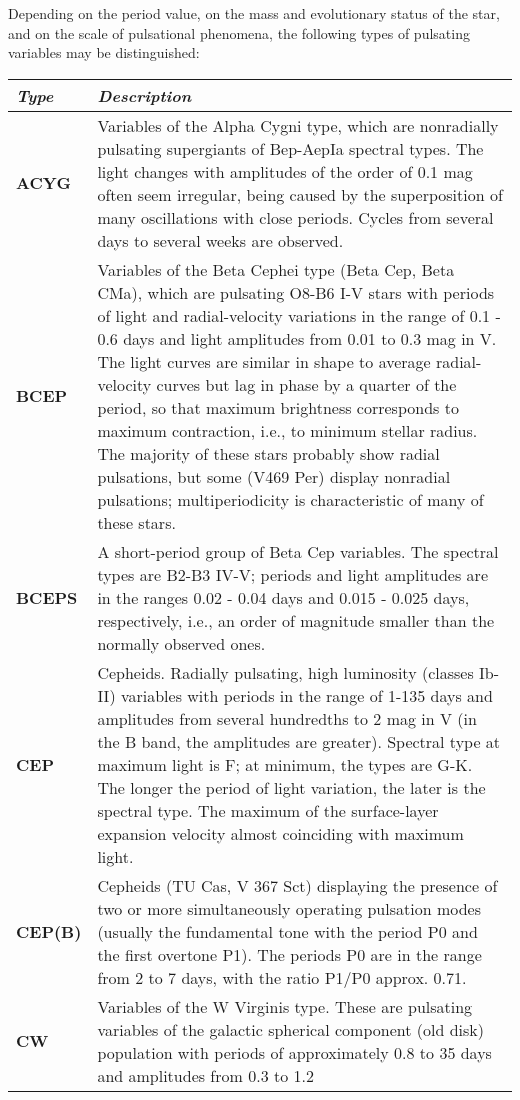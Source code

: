 Depending on the period value, on the mass and evolutionary status of
the star, and on the scale of pulsational phenomena, the following types
of pulsating variables may be distinguished:

\begin{longtabu} to \textwidth {l|X}
\toprule
\emph{Type} & \emph{Description}\tabularnewline
\midrule
\textbf{ACYG} & Variables of the Alpha Cygni type, which are nonradially
pulsating supergiants of Bep-AepIa spectral types. The light changes
with amplitudes of the order of 0.1 mag often seem irregular, being
caused by the superposition of many oscillations with close periods.
Cycles from several days to several weeks are observed.\tabularnewline
\textbf{BCEP} & Variables of the Beta Cephei type (Beta Cep, Beta CMa),
which are pulsating O8-B6 I-V stars with periods of light and
radial-velocity variations in the range of 0.1 - 0.6 days and light
amplitudes from 0.01 to 0.3 mag in V. The light curves are similar in
shape to average radial-velocity curves but lag in phase by a quarter of
the period, so that maximum brightness corresponds to maximum
contraction, i.e., to minimum stellar radius. The majority of these
stars probably show radial pulsations, but some (V469 Per) display
nonradial pulsations; multiperiodicity is characteristic of many of
these stars.\tabularnewline
\textbf{BCEPS} & A short-period group of Beta Cep variables. The
spectral types are B2-B3 IV-V; periods and light amplitudes are in the
ranges 0.02 - 0.04 days and 0.015 - 0.025 days, respectively, i.e., an
order of magnitude smaller than the normally observed
ones.\tabularnewline
\textbf{CEP} & Cepheids. Radially pulsating, high luminosity (classes
Ib-II) variables with periods in the range of 1-135 days and amplitudes
from several hundredths to 2 mag in V (in the B band, the amplitudes are
greater). Spectral type at maximum light is F; at minimum, the types are
G-K. The longer the period of light variation, the later is the spectral
type. The maximum of the surface-layer expansion velocity almost
coinciding with maximum light.\tabularnewline
\textbf{CEP(B)} & Cepheids (TU Cas, V 367 Sct) displaying the presence
of two or more simultaneously operating pulsation modes (usually the
fundamental tone with the period P0 and the first overtone P1). The
periods P0 are in the range from 2 to 7 days, with the ratio P1/P0
approx. 0.71.\tabularnewline
\textbf{CW} & Variables of the W Virginis type. These are pulsating
variables of the galactic spherical component (old disk) population with
periods of approximately 0.8 to 35 days and amplitudes from 0.3 to 1.2

\end{longtabu}
